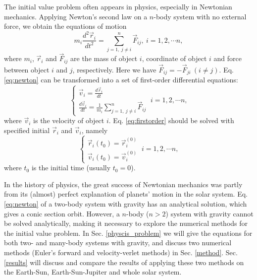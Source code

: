The initial value problem often appears in physics, especially in Newtonian mechanics. 
Applying Newton's second law on a $n$-body system with no external force, we obtain the equations of motion 
\begin{equation}\label{eq:newton}
m_i\frac{d^2\vec{r}_i}{dt^2}=\sum_{j=1,\ j\neq i}^{n}\vec{F}_{ij},\ i=1,2,\cdots n, 
\end{equation}
where $m_i$, $\vec{r}_i$ and $\vec{F}_{ij}$ are the mass of object $i$, coordinate of object $i$ 
and force between object $i$ and $j$, respectively. 
Here we have $\vec{F}_{ij}=-\vec{F}_{ji}\ (i\neq j)$. 
Eq. \ref{eq:newton} can be transformed into a set of first-order differential equations: 
\begin{equation}\label{eq:firstorder}
	\left\{  
	\begin{array}{lr}  
	\vec{v}_i=\frac{d\vec{r}_i}{dt} \\
	\frac{d\vec{v}_i}{dt}=\frac{1}{m_i}\sum_{j=1,\ j\neq i}^{n}\vec{F}_{ij} 
	\end{array}  
	\right. 
	\ i=1,2,\cdots n, 
\end{equation}
where $\vec{v}_i$ is the velocity of object $i$. 
Eq. \ref{eq:firstorder} should be solved with specified initial $\vec{r}_i$ and $\vec{v}_i$, namely 
\begin{equation}
	\left\{  
	\begin{array}{lr}  
	\vec{r}_i(t_0)=\vec{r}^{(0)}_i \\
	\vec{v}_i(t_0)=\vec{v}^{(0)}_i
	\end{array}  
	\right. 
	\ i=1,2,\cdots n, 
\end{equation}
where $t_0$ is the initial time (usually $t_0=0$). 
\par
In the history of physics, the great success of Newtonian mechanics was partly from 
its (almost) perfect explanation of planets' motion in the solar system. 
Eq. \ref{eq:newton} of a two-body system with gravity has an analytical solution, 
which gives a conic section orbit. 
However, a $n$-body ($n>2$) system with gravity cannot be solved analytically, 
making it necessary to explore the numerical methods for the initial value problem. 
In Sec. \ref{physcis_problem} we will give the equations for both two- and many-body systems with gravity, 
and discuss two numerical methods (Euler's forward and velocity-verlet methods) in Sec. \ref{method}. 
Sec. \ref{results} will discuss and compare the results of applying
these two methods on the Earth-Sun, Earth-Sun-Jupiter and whole solar system. 